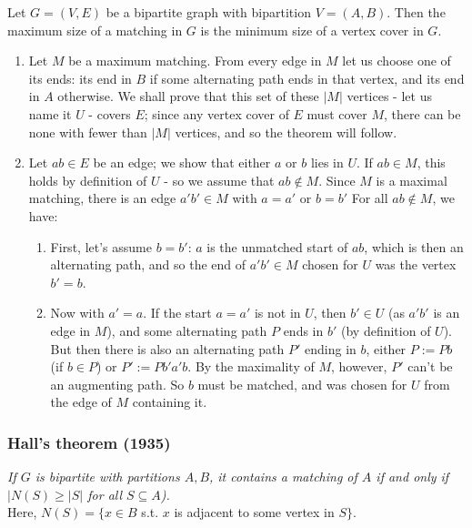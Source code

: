\documentclass[11pt]{book}
\begin{document}
Let $G = (V,E)$ be a bipartite graph with bipartition $V = (A, B)$. Then the maximum size of a matching in $G$ is the minimum size of a vertex cover in $G$.
	\begin{enumerate}
		\item Let $M$ be a maximum matching. From every edge in $M$ let us choose one of its ends: its end in $B$ if some alternating path ends in that vertex, and its end in $A$ otherwise. We shall prove that this set of these $|M|$ vertices - let us name it $U$ - covers $E$; since any vertex cover of $E$ must cover $M$, there can be none with fewer than $|M|$ vertices, and so the theorem will follow.
		\item Let $ab \in E$ be an edge; we show that either $a$ or $b$ lies in $U$. If $ab \in M$, this holds by definition of $U$ - so we assume that $ab \notin M$. Since $M$ is a maximal matching, there is an edge $a'b' \in M$ with $a = a'$ or $b = b'$ For all $ab \notin M$, we have:
			\begin{enumerate} 
				\item First, let's assume $b = b'$: $a$ is the unmatched start of $ab$, which is then an alternating path, and so the end of $a'b' \in M$ chosen for $U$ was the vertex $b' = b$.
				\item Now with $a' = a$. If the start $a = a'$  is not in $U$, then $b' \in U$ (as $a'b'$ is an edge in $M$), and some alternating path $P$ ends in $b'$ (by definition of $U$). But then there is also an alternating path $P'$ ending in $b$, either $P := Pb$ (if $b \in P$) or $P' := Pb'a'b$. By the maximality of $M$, however, $P'$ can't be an augmenting path. So $b$ must be matched, and was chosen for $U$ from the edge of $M$ containing it.
			\end{enumerate}
	\end{enumerate}
	
\subsubsection{Hall's theorem (1935)} 

\textit{If $G$ is bipartite with partitions $A,B$, it contains a matching of $A$ if and only if $|N(S) \geq |S|$ for all $S \subseteq A$).}\\

Here, $N(S) = \{ x \in B $ s.t. $x$ is adjacent to some vertex in $S \}$.\\
\end{document}

